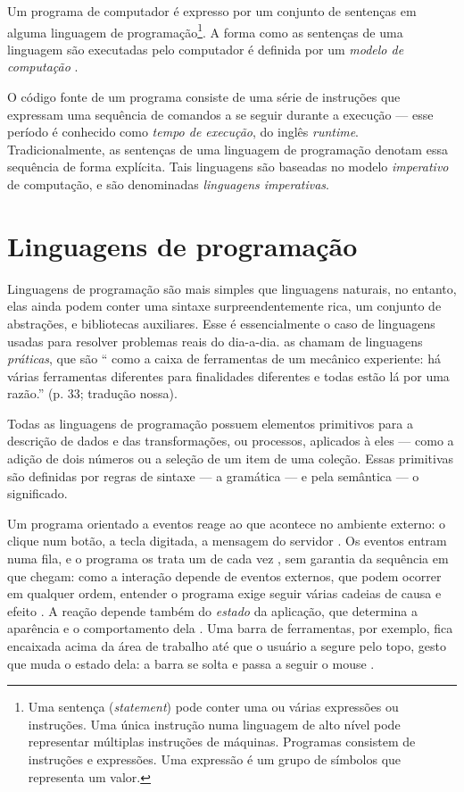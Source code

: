 Um programa de computador é expresso por um conjunto de sentenças em alguma
linguagem de programação\footnote{Uma sentença (\emph{statement}) pode conter uma ou várias expressões ou instruções.
Uma única instrução numa linguagem de alto nível pode representar múltiplas
instruções de máquinas.
Programas consistem de instruções e expressões.
Uma expressão é um grupo de símbolos que representa um valor.}.
A forma como as sentenças de uma linguagem são executadas pelo computador é
definida por um \emph{modelo de computação} \cite{vanroy2004}.

O código fonte de um programa consiste de uma série de instruções que expressam
uma sequência de comandos a se seguir durante a execução — esse período é
conhecido como \emph{tempo de execução}, do inglês \emph{runtime}.
Tradicionalmente, as sentenças de uma linguagem de programação denotam essa
sequência de forma explícita.
Tais linguagens são baseadas no modelo \emph{imperativo} de computação, e são
denominadas \emph{linguagens imperativas}.
\section{Linguagens de programação}
\label{sec:linguagens-de-programacao}
\label{sec:langs}

Linguagens de programação são mais simples que linguagens naturais, no
entanto, elas ainda podem conter uma sintaxe surpreendentemente rica, um
conjunto de abstrações, e bibliotecas auxiliares.
Esse é essencialmente o caso de linguagens usadas para resolver problemas
reais do dia-a-dia.
\textcite{vanroy2004} as chamam de linguagens \emph{práticas}, que são “\textelp{}
como a caixa de ferramentas de um mecânico experiente: há várias ferramentas
diferentes para finalidades diferentes e todas estão lá por uma razão.” (p.
33; tradução nossa).

Todas as linguagens de programação possuem elementos primitivos para a
descrição de dados e das transformações, ou processos, aplicados à eles —
como a adição de dois números ou a seleção de um item de uma coleção.
Essas primitivas são definidas por regras de sintaxe — a gramática — e pela
semântica — o significado.

Um programa orientado a eventos reage ao que acontece no ambiente externo: o
clique num botão, a tecla digitada, a mensagem do servidor
\cite[p. 86:1]{madsen2017}.
Os eventos entram numa fila, e o programa os trata um de cada vez
\cite[p. 86:1]{madsen2017}, sem garantia da sequência em que chegam:
como a interação depende de eventos externos, que podem ocorrer em
qualquer ordem, entender o programa exige seguir várias cadeias de causa
e efeito \cite[p. 125]{martin2022}.
A reação depende também do \emph{estado} da aplicação, que determina a
aparência e o comportamento dela \cite[p. 230]{oney2012}.
Uma barra de ferramentas, por exemplo, fica encaixada acima da área de
trabalho até que o usuário a segure pelo topo, gesto que muda o estado
dela: a barra se solta e passa a seguir o mouse \cite[p. 230]{oney2012}.

